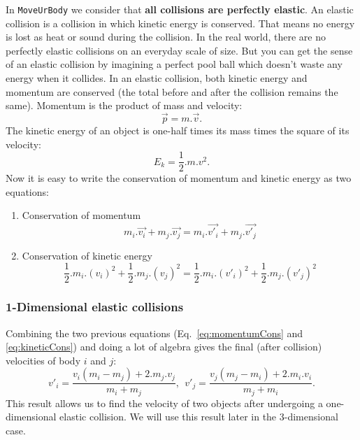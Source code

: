 In \texttt{MoveUrBody} we consider that \textbf{all collisions are perfectly elastic}.
An elastic collision is a collision in which kinetic energy is conserved. 
That means no energy is lost as heat or sound during the collision. 
In the real world, there are no perfectly elastic collisions on an everyday scale of size. 
But you can get the sense of an elastic collision by imagining a perfect pool ball which doesn't waste any energy when it collides. 
In an elastic collision, both kinetic energy and momentum are conserved (the total before and after the collision remains the same).
Momentum is the product of mass and velocity: 
\begin{equation}	
\label{eq:momentum}
	\vec{p} = m . \vec{v}.
\end{equation}
The kinetic energy of an object is one-half times its mass times the square of its velocity:
\begin{equation}	
\label{eq:kinetic}
	E_k = \frac{1}{2} . m . v^2.
\end{equation}
Now it is easy to write the conservation of momentum and kinetic energy as two equations:
\begin{enumerate}
	\item Conservation of momentum
		\begin{equation}	
		\label{eq:momentumCons}
			m_i . \vec{v_i} + m_j . \vec{v_j} = m_i . \vec{v'_i} + m_j . \vec{v'_j}
		\end{equation}
		
	\item Conservation of kinetic energy
		\begin{equation}	
		\label{eq:kineticCons}
			\frac{1}{2} . m_i . (v_i)^2 + \frac{1}{2} . m_j . (v_j)^2 = \frac{1}{2} . m_i . (v'_i)^2 + \frac{1}{2} . m_j . (v'_j)^2
		\end{equation}
\end{enumerate}

\subsubsection{1-Dimensional elastic collisions}
Combining the two previous equations (Eq.~\ref{eq:momentumCons} and \ref{eq:kineticCons}) and doing a lot of algebra gives the final (after collision) velocities of body $i$ and $j$:
\begin{equation}	
\label{eq:1DelasticSols}
	v'_i = \frac{v_i(m_i-m_j) + 2.m_j.v_j}{m_i + m_j},~~v'_j = \frac{v_j(m_j-m_i) + 2.m_i.v_i}{m_j + m_i}.
\end{equation}
This result allows us to find the velocity of two objects after undergoing a one-dimensional elastic collision. 
We will use this result later in the 3-dimensional case.

